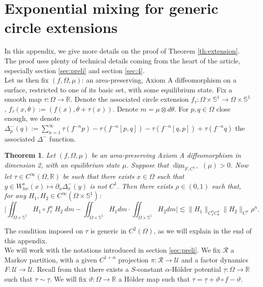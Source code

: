 \documentclass[a4paper]{article}
\newtheorem{theorem}{Theorem}[section]
\theoremstyle{definition}
\begin{document}
\section{Exponential mixing for generic circle extensions}\label{ap:E}

In this appendix, we give more details on the proof of Theorem \ref{th:extension}. The proof uses plenty of technical details coming from the heart of the article, especially section \ref{sec:preli} and section \ref{sec:4}. \\
Let us then fix $(f,\Omega,\mu)$: an area-preserving, Axiom A diffeomorphism on a surface, restricted to one of its basic set, with some equilibrium state. Fix a smooth map $\tau:\Omega \rightarrow \mathbb{R}$. Denote the associated circle extension $f_\tau:\Omega \times \mathbb{S}^1 \rightarrow \Omega \times \mathbb{S}^1$,  $f_\tau(x,\theta) := (f(x),\theta+\tau(x))$. Denote $m = \mu \otimes d\theta$. For $p,q \in \Omega$ close enough, we denote $\Delta^-_p(q) := \sum_{n=1}^\infty \tau(f^{-n}p) - \tau(f^{-n}[p,q]) - \tau(f^{-n}[q,p]) + \tau(f^{-n}q)$ the associated $\Delta^-$ function.

\begin{theorem}\label{th:Emain}
Let $(f,\Omega,\mu)$ be an area-preserving Axiom A diffeomorphism in dimension 2, with an equilibrium state $\mu$. Suppose that $\underline{\dim}_{F,C^{1+}}(\mu)>0$. Now let $\tau \in C^\infty(\Omega,\mathbb{R})$ be such that there exists $x \in \Omega$ such that $y \in W^s_{loc}(x) \mapsto \partial_u\Delta^-_x(y)$ is not $C^1$. Then there exists $\rho \in (0,1)$ such that, for any $H_1,H_2 \in C^\infty(\Omega \times \mathbb{S}^1)$:
$$ \Big| \iint_{\Omega \times \mathbb{S}^1} H_1 \circ f_\tau^n \ H_2 \ dm - \iint_{\Omega \times \mathbb{S}^1} H_1 dm \cdot \iint_{\Omega \times \mathbb{S}^1} H_2 dm \Big| \lesssim \|H_1\|_{C^\alpha_x C^4_\theta} \|H_2\|_{C^\alpha} \rho^n . $$
\end{theorem}

The condition imposed on $\tau$ is generic in $C^2(\Omega)$, as we will explain in the end of this appendix. \\
We will work with the notations introduced in section \ref{sec:preli}. We fix $\mathcal{R}$ a Markov partition, with a given $C^{1+\alpha}$ projection $\pi: \mathcal{R} \rightarrow \mathcal{U}$ and a factor dynamics $F:\mathcal{U}\rightarrow \mathcal{U}$. Recall from \cite{PP90} that there exists a $S$-constant $\alpha$-Hölder potential $\underline{\tau}:\Omega \rightarrow \mathbb{R}$ such that $\tau \sim \underline{\tau}$. We will fix $\vartheta:\Omega\rightarrow \mathbb{R}$ a Hölder map such that $\tau = \underline{\tau} + \vartheta \circ f - \vartheta$.
\end{document}
